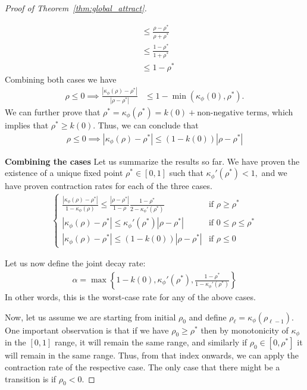 \documentclass[twoside]{article}
\newcommand{\km}{\kappa_\phi}
\theoremstyle{definition}
\begin{document}
\begin{proof}[Proof of Theorem~\ref{thm:global_attract}]
\begin{itemize}
\begin{align*}
&\le \frac{\rho-\rho^*}{\rho+\rho^*} \\
&\le \frac{1-\rho^*}{1+\rho^*} \\
&\le 1-\rho^*
\end{align*} 
Combining both cases we have 
\begin{align*}
\rho \le 0 \implies \frac{|\km(\rho)-\rho^*|}{|\rho-\rho^*|} &\le 1-\min(\km(0),\rho^*).
\end{align*}
We can further prove that $\rho^* = \km(\rho^*) = k(0) + \text{non-negative terms}$, which implies that $\rho^* \ge k(0)$. Thus, we can conclude that 
\begin{align*}
\rho \le 0 \implies |\km(\rho)-\rho^*| \le (1 - k(0))|\rho-\rho^*|
\end{align*}
\end{itemize}



\textbf{Combining the cases}
Let us summarize the results so far. We have proven the existence of a unique fixed point $\rho^*\in[0,1]$ such that $\km'(\rho^*)< 1,$ and we have proven contraction rates for each of the three cases.
\begin{align*}
\begin{cases}
\frac{|\km(\rho)-\rho^*|}{1-\km(\rho)} \le \frac{|\rho-\rho^*|}{1-\rho}\frac{1-\rho^*}{2-\km'(\rho^*)} & \text{if } \rho \ge \rho^* \\
|\km(\rho)-\rho^*| \le \km'(\rho^*)|\rho-\rho^*| & \text{if } 0 \le \rho \le \rho^*\\
|\km(\rho)-\rho^*| \le (1 - k(0))|\rho-\rho^*| & \text{if } \rho \le 0 
\end{cases}
\end{align*}


Let us now define the joint decay rate:
\begin{align*}
\alpha = \max\left\{1 - k(0), \km'(\rho^*), \frac{1-\rho^*}{1-\km'(\rho^*)}\right\}
\end{align*}
In other words, this is the worst-case rate for any of the above cases. 

Now, let us assume we are starting from initial $\rho_0$ and define $\rho_\ell = \km(\rho_{\ell-1})$. One important observation is that if we have $\rho_0 \ge \rho^*$ then by monotonicity of $\km$ in the $[0,1]$ range, it will remain the same range, and similarly if $\rho_0\in[0,\rho^*]$ it will remain in the same range. Thus, from that index onwards, we can apply the contraction rate of the respective case. The only case that there might be a transition is if $\rho_0 < 0$. 


\end{proof}
\end{document}

